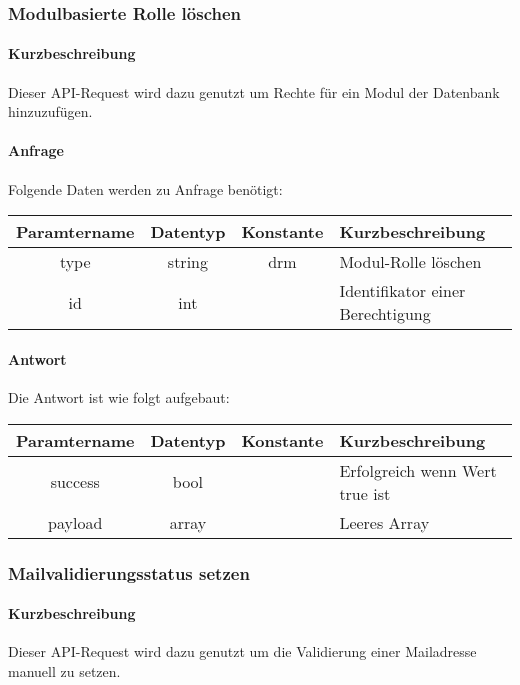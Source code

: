 \subsubsection{Modulbasierte Rolle löschen}
\paragraph{Kurzbeschreibung}Dieser API-Request wird dazu genutzt um Rechte für ein Modul der Datenbank hinzuzufügen.
\paragraph{Anfrage}Folgende Daten werden zu Anfrage benötigt:
\begin{table}[H]
	\begin{tabular}{|c|c|c|p{6.5cm}|}
		\hline
		\textbf{Paramtername} & \textbf{Datentyp} & \textbf{Konstante} & \textbf{Kurzbeschreibung}                                                                                               \\ \hline
		type                & string            & drm                & Modul-Rolle löschen \\ \hline
		id                  & int               &                    & Identifikator einer Berechtigung \\ \hline
	\end{tabular}
\end{table}
\paragraph{Antwort}Die Antwort ist wie folgt aufgebaut:
\begin{table}[H]
	\begin{tabular}{|c|c|c|p{6.5cm}|}
		\hline
		\textbf{Paramtername} & \textbf{Datentyp} & \textbf{Konstante} & \textbf{Kurzbeschreibung}            \\ \hline                
		success             & bool             &                 & Erfolgreich wenn Wert {\glqq true\grqq} ist \\ \hline
		payload             & array            &                 & Leeres Array \\ \hline
	\end{tabular}
\end{table}
\subsubsection{Mailvalidierungsstatus setzen}
\paragraph{Kurzbeschreibung}Dieser API-Request wird dazu genutzt um die Validierung einer Mailadresse manuell zu setzen.
